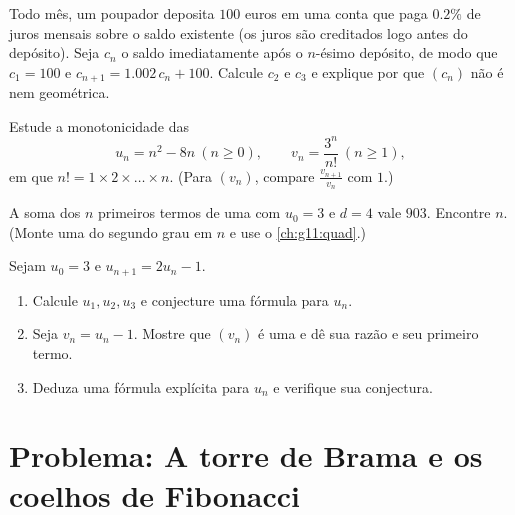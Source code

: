 \begin{exercise}[$\star\star$]\label{exo:g11:seq:8}
Todo mês, um poupador deposita $100$ euros em uma conta que paga
$0.2\%$ de juros mensais sobre o saldo existente (os juros são creditados
logo antes do depósito). Seja $c_n$ o saldo imediatamente após o
$n$-ésimo depósito, de modo que $c_1 = 100$ e
$c_{n+1} = 1.002\,c_n + 100$. Calcule $c_2$ e $c_3$ e explique por que
$(c_n)$ não é  nem geométrica.
\end{exercise}

\begin{exercise}[$\star\star$]\label{exo:g11:seq:9}
Estude a monotonicidade das 
\[
u_n = n^2 - 8n \ (n \geq 0), \qquad
v_n = \frac{3^n}{n!}\ (n \geq 1),
\]
em que $n! = 1 \times 2 \times \dots \times n$. (Para $(v_n)$, compare
$\frac{v_{n+1}}{v_n}$ com $1$.)
\end{exercise}

\begin{exercise}[$\star\star$]\label{exo:g11:seq:10}
A soma dos $n$ primeiros termos de uma  com
$u_0 = 3$ e $d = 4$ vale $903$. Encontre $n$. (Monte uma  do
segundo grau em $n$ e use o \cref{ch:g11:quad}.)
\end{exercise}

\begin{exercise}[$\star\star\star$]\label{exo:g11:seq:11}
Sejam $u_0 = 3$ e $u_{n+1} = 2u_n - 1$.
\begin{enumerate}
  \item Calcule $u_1, u_2, u_3$ e conjecture uma fórmula para $u_n$.
  \item Seja $v_n = u_n - 1$. Mostre que $(v_n)$ é uma  e dê sua razão e seu primeiro termo.
  \item Deduza uma fórmula explícita para $u_n$ e verifique sua
        conjectura.
\end{enumerate}
\end{exercise}

\section{Problema: A torre de Brama e os coelhos de Fibonacci}

